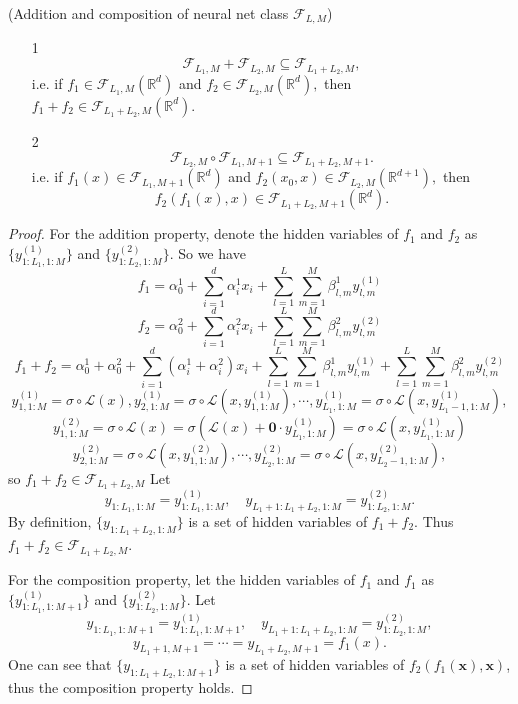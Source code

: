 \begin{proposition}\label{prop:net class}
(Addition and composition of neural net class $\mathcal F_{L,M}$)
\begin{itemize}
\item[1]
$$
\mathcal F_{L_1,M} + \mathcal{F}_{L_2,M} \subseteq \mathcal{F}_{L_1+L_2,M},
$$
i.e. if $f_1\in \mathcal F_{L_1,M}(\mathbb{R}^d)$ and $f_2\in \mathcal{F}_{L_2,M}(\mathbb{R}^d),$ then $f_1+f_2\in\mathcal{F}_{L_1+L_2,M}(\mathbb{R}^d)$.
\item[2]
$$
\mathcal F_{L_2,M}\circ \mathcal F_{L_1,M+1} \subseteq \mathcal F_{L_1+L_2,M+1}.
$$ 
i.e. if $f_1(x)\in \mathcal{F}_{L_1,M+1}(\mathbb{R}^d)$ and $f_2(x_0,x)\in \mathcal{F}_{L_2,M}(\mathbb{R}^{d+1}),$ then 
$$
f_2(f_1(x),x)\in \mathcal{F}_{L_1+L_2,M+1}(\mathbb{R}^d).
$$
\end{itemize}
\end{proposition}

\newpage
\begin{proof}
For the addition property, denote the hidden variables of $f_1$ and $f_2$ as $\{y_{1:L_1,1:M}^{(1)}\}$ and $\{y_{1:L_2,1:M}^{(2)}\}$. 
So we have 
\[
f_1 = \alpha_0^1 + \sum_{i=1}^d \alpha^1_ix_i+\sum_{l=1}^L\sum_{m=1}^M \beta^1_{l,m}y^{(1)}_{l,m}
\]
\[
f_2 = \alpha_0^2 + \sum_{i=1}^d \alpha^2_ix_i+\sum_{l=1}^L\sum_{m=1}^M \beta^2_{l,m}y^{(2)}_{l,m}
\]
\[
f_1+f_2 = \alpha_0^1 + \alpha_0^2 + \sum_{i=1}^d (\alpha_i^1+\alpha_i^2)x_i + \sum_{l=1}^L\sum_{m=1}^M \beta^1_{l,m}y^{(1)}_{l,m} +\sum_{l=1}^L\sum_{m=1}^M \beta^2_{l,m}y^{(2)}_{l,m}
\]
$$
y^{(1)}_{1,1:M} = \sigma\circ \mathcal{L}(x),y^{(1)}_{2,1:M} = \sigma\circ \mathcal L(x,y^{(1)}_{1,1:M}),\cdots,y^{(1)}_{L_1,1:M}=\sigma\circ \mathcal L(x,y^{(1)}_{L_1-1,1:M}),
$$
$$
y^{(2)}_{1,1:M} = \sigma\circ \mathcal{L}(x) =\sigma(\mathcal L(x)+\bm 0\cdot y^{(1)}_{L_1,1:M}) = \sigma\circ \mathcal{L}(x,y^{(1)}_{L_1,1:M})
$$
$$
y^{(2)}_{2,1:M} = \sigma\circ \mathcal L(x,y^{(2)}_{1,1:M}),\cdots,y^{(2)}_{L_2,1:M}=\sigma\circ \mathcal L(x,y^{(2)}_{L_2-1,1:M}),
$$
so $f_1 + f_2 \in \mathcal{F}_{L_1+L_2,M}$
Let
$$
y_{1:L_1,1:M} = y_{1:L_1,1:M}^{(1)},\quad y_{L_1+1:L_1+L_2,1:M} = y_{1:L_2,1:M}^{(2)}. 
$$
By definition, $\{y_{1:L_1+L_2,1:M}\}$ is a set of hidden variables of $f_1+f_2$. Thus $f_1+f_2\in \mathcal F_{L_1+L_2,M}.$

For the composition property, let the hidden variables of $f_1$ and $f_1$ as $\{y_{1:L_1,1:M+1}^{(1)}\}$ and $\{y_{1:L_2,1:M}^{(2)}\}$. Let
$$
y_{1:L_1,1:M+1} = y_{1:L_1,1:M+1}^{(1)},\quad y_{L_1+1:L_1+L_2,1:M} = y_{1:L_2,1:M}^{(2)},
$$
$$
y_{L_1+1,M+1} =\cdots= y_{L_1+L_2,M+1} = f_1(x).
$$
One can see that $\{y_{1:L_1+L_2,1:M+1}\}$ is a set of hidden variables of $f_2(f_1(\bm x),\bm x)$, thus the composition property holds.
\end{proof}

